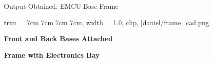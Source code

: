 \documentclass{beamer}
\begin{document}
\begin{frame} {Output Obtained: EMCU Base Frame}
\begin{center}
\begin{minipage} {0.46\textwidth}
\begin{center}
                    trim = {7cm 7cm 7cm 7cm},
                    width = 1.0\textwidth,
                    clip,
                ]{daniel/frame_cad.png}
            \end{center}
        \end{minipage}
        \begin{minipage} {0.48\textwidth}
            \centering
            \textbf{Front and Back Bases Attached}
        \end{minipage}
        \hfill
        \begin{minipage} {0.46\textwidth}
            \centering
            \textbf{Frame with Electronics Bay}
        \end{minipage}
    \end{center}

\end{frame}

\end{document}
